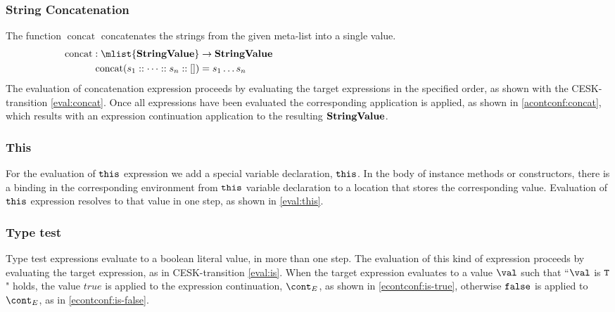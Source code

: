 \documentclass{article}
\DeclareMathOperator{\concat}{concat}
\begin{document}
\subsubsection{String Concatenation}
\label{subsubsec:string-concatenation}
The function $\concat$ concatenates the strings from the given meta-list into a single value.
\begin{align*}
  \concat : \mlist{\dstring} &\rightarrow \dstring \hspace{100mm} \\
  \concat( s_1 :: \dots :: s_n :: []) &= s_1 \dots s_n
\end{align*}
The evaluation of concatenation expression proceeds by evaluating the target expressions in the specified order, as shown with the CESK-transition \eqref{eval:concat}.
Once all expressions have been evaluated the corresponding application is applied, as shown in \eqref{acontconf:concat}, which results with an expression continuation application to the resulting $\mathbf{StringValue}$.
\subsubsection{This}
For the evaluation of $\tt{this}$ expression we add a special variable declaration, $\tt{this}$.
In the body of instance methods or constructors, there is a binding in the corresponding environment from $\tt{this}$ variable declaration to a location that stores the corresponding value.
Evaluation of $\tt{this}$ expression resolves to that value in one step, as shown in \eqref{eval:this}.
\subsubsection{Type test}
\label{subsubsec:type-test}
Type test expressions evaluate to a boolean literal value, in more than one step.
The evaluation of this kind of expression proceeds by evaluating the target expression, as in CESK-transition \eqref{eval:is}.
When the target expression evaluates to a value $\val$ such that ``$\val $ is $\tt{T}$" holds, the value $true$ is applied to the expression continuation, $\econt$, as shown in \eqref{econtconf:is-true}, otherwise $\tt{false}$ is applied to $\econt$, as in \eqref{econtconf:is-false}. 
\end{document}
